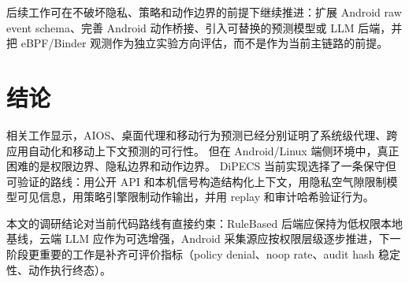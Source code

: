 \documentclass[12pt,a4paper]{article}
\begin{document}
后续工作可在不破坏隐私、策略和动作边界的前提下继续推进：扩展 Android raw event schema、完善 Android 动作桥接、引入可替换的预测模型或 LLM 后端，并把 eBPF/Binder 观测作为独立实验方向评估，而不是作为当前主链路的前提。

\section{结论}\label{sec:conclusion}

相关工作显示，AIOS、桌面代理和移动行为预测已经分别证明了系统级代理、跨应用自动化和移动上下文预测的可行性。
但在 Android/Linux 端侧环境中，真正困难的是权限边界、隐私边界和动作边界。
DiPECS 当前实现选择了一条保守但可验证的路线：用公开 API 和本机信号构造结构化上下文，用隐私空气隙限制模型可见信息，用策略引擎限制动作输出，并用 replay 和审计哈希验证行为。

本文的调研结论对当前代码路线有直接约束：RuleBased 后端应保持为低权限本地基线，云端 LLM 应作为可选增强，Android 采集源应按权限层级逐步推进，下一阶段更重要的工作是补齐可评价指标（policy denial、noop rate、audit hash 稳定性、动作执行终态）。



\end{document}
